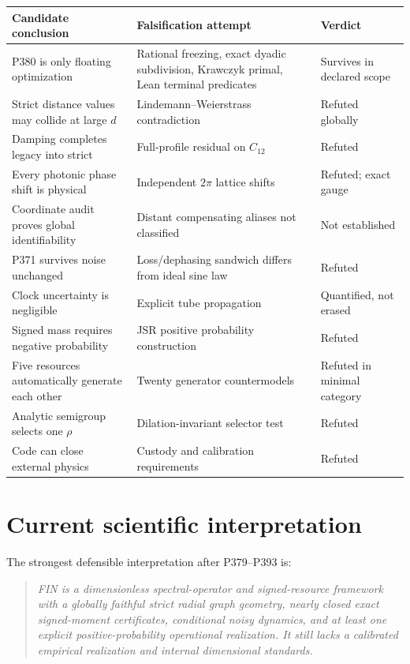 \documentclass[11pt,a4paper,openany]{report}
\begin{document}
\begin{center}
\begingroup\small
\setlength{\tabcolsep}{2.5pt}
\renewcommand{\arraystretch}{1.16}
\begin{longtable}{@{}p{}p{}p{}@{}}
\toprule
\textbf{Candidate conclusion} & \textbf{Falsification attempt} & \textbf{Verdict} \\
\midrule
\endhead
P380 is only floating optimization & Rational freezing, exact dyadic subdivision, Krawczyk primal, Lean terminal predicates & Survives in declared scope \\
Strict distance values may collide at large \(d\) & Lindemann--Weierstrass contradiction & Refuted globally \\
Damping completes legacy into strict & Full-profile residual on \(C_{12}\) & Refuted \\
Every photonic phase shift is physical & Independent \(2\pi\) lattice shifts & Refuted; exact gauge \\
Coordinate audit proves global identifiability & Distant compensating aliases not classified & Not established \\
P371 survives noise unchanged & Loss/\allowbreak{}dephasing sandwich differs from ideal sine law & Refuted \\
Clock uncertainty is negligible & Explicit tube propagation & Quantified, not erased \\
Signed mass requires negative probability & JSR positive probability construction & Refuted \\
Five resources automatically generate each other & Twenty generator countermodels & Refuted in minimal category \\
Analytic semigroup selects one \(\rho\) & Dilation-invariant selector test & Refuted \\
Code can close external physics & Custody and calibration requirements & Refuted \\
\bottomrule
\end{longtable}
\endgroup
\end{center}

\chapter{Current scientific interpretation}

The strongest defensible interpretation after P379--P393 is:

\begin{quote}\itshape
FIN is a dimensionless spectral-operator and signed-resource framework with a globally faithful strict radial graph geometry, nearly closed exact signed-moment certificates, conditional noisy dynamics, and at least one explicit positive-probability operational realization. It still lacks a calibrated empirical realization and internal dimensional standards.

\end{quote}
\end{document}
